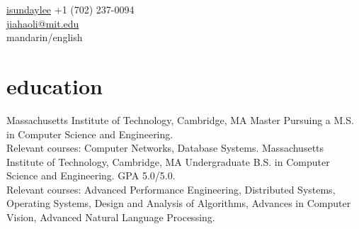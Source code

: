 \documentclass[]{friggeri-cv} %
\begin{document}
{\faGithub \hspace{0.1em} \href{https://github.com/isundaylee}{isundaylee}}
{+1 (702) 237-0094\\
\href{mailto:jiahaoli@mit.edu}{jiahaoli@mit.edu}\\
mandarin/english} %




\section{education}

\begin{entrylist}
  {Massachusetts Institute of Technology, Cambridge, MA}
  {Master}
  {Pursuing a M.S. in Computer Science and Engineering. \\
  Relevant courses: Computer Networks, Database Systems.}
  {Massachusetts Institute of Technology, Cambridge, MA}
  {Undergraduate}
  {B.S. in Computer Science and Engineering. GPA 5.0/5.0. \\
  Relevant courses: Advanced Performance Engineering, Distributed Systems, Operating Systems, Design and Analysis of Algorithms, Advances in Computer Vision, Advanced Natural Language Processing.}
\end{entrylist}
\end{document}
